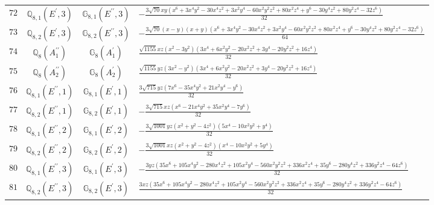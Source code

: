 \documentclass[fleqn,8pt,landscape]{jsarticle}
\begin{document}
\begin{table}[ht!]
\begin{center}
\begin{tabular}{cccl}
$ 72 $ & $ \mathbb{Q}_{8,1}(E^{\prime},3) $ & $ \mathbb{G}_{8,1}(E^{\prime\prime},3) $ & $ - \frac{3 \sqrt{70} x y \left(x^{6} + 3 x^{4} y^{2} - 30 x^{4} z^{2} + 3 x^{2} y^{4} - 60 x^{2} y^{2} z^{2} + 80 x^{2} z^{4} + y^{6} - 30 y^{4} z^{2} + 80 y^{2} z^{4} - 32 z^{6}\right)}{32} $ \\
$ 73 $ & $ \mathbb{Q}_{8,2}(E^{\prime},3) $ & $ \mathbb{G}_{8,2}(E^{\prime\prime},3) $ & $ - \frac{3 \sqrt{70} \left(x - y\right) \left(x + y\right) \left(x^{6} + 3 x^{4} y^{2} - 30 x^{4} z^{2} + 3 x^{2} y^{4} - 60 x^{2} y^{2} z^{2} + 80 x^{2} z^{4} + y^{6} - 30 y^{4} z^{2} + 80 y^{2} z^{4} - 32 z^{6}\right)}{64} $ \\
$ 74 $ & $ \mathbb{Q}_{8}(A_{1}^{\prime\prime}) $ & $ \mathbb{G}_{8}(A_{1}^{\prime}) $ & $ \frac{\sqrt{1155} x z \left(x^{2} - 3 y^{2}\right) \left(3 x^{4} + 6 x^{2} y^{2} - 20 x^{2} z^{2} + 3 y^{4} - 20 y^{2} z^{2} + 16 z^{4}\right)}{32} $ \\
$ 75 $ & $ \mathbb{Q}_{8}(A_{2}^{\prime\prime}) $ & $ \mathbb{G}_{8}(A_{2}^{\prime}) $ & $ \frac{\sqrt{1155} y z \left(3 x^{2} - y^{2}\right) \left(3 x^{4} + 6 x^{2} y^{2} - 20 x^{2} z^{2} + 3 y^{4} - 20 y^{2} z^{2} + 16 z^{4}\right)}{32} $ \\
$ 76 $ & $ \mathbb{Q}_{8,1}(E^{\prime\prime},1) $ & $ \mathbb{G}_{8,1}(E^{\prime},1) $ & $ \frac{3 \sqrt{715} y z \left(7 x^{6} - 35 x^{4} y^{2} + 21 x^{2} y^{4} - y^{6}\right)}{32} $ \\
$ 77 $ & $ \mathbb{Q}_{8,2}(E^{\prime\prime},1) $ & $ \mathbb{G}_{8,2}(E^{\prime},1) $ & $ - \frac{3 \sqrt{715} x z \left(x^{6} - 21 x^{4} y^{2} + 35 x^{2} y^{4} - 7 y^{6}\right)}{32} $ \\
$ 78 $ & $ \mathbb{Q}_{8,1}(E^{\prime\prime},2) $ & $ \mathbb{G}_{8,1}(E^{\prime},2) $ & $ - \frac{3 \sqrt{1001} y z \left(x^{2} + y^{2} - 4 z^{2}\right) \left(5 x^{4} - 10 x^{2} y^{2} + y^{4}\right)}{32} $ \\
$ 79 $ & $ \mathbb{Q}_{8,2}(E^{\prime\prime},2) $ & $ \mathbb{G}_{8,2}(E^{\prime},2) $ & $ - \frac{3 \sqrt{1001} x z \left(x^{2} + y^{2} - 4 z^{2}\right) \left(x^{4} - 10 x^{2} y^{2} + 5 y^{4}\right)}{32} $ \\
$ 80 $ & $ \mathbb{Q}_{8,1}(E^{\prime\prime},3) $ & $ \mathbb{G}_{8,1}(E^{\prime},3) $ & $ - \frac{3 y z \left(35 x^{6} + 105 x^{4} y^{2} - 280 x^{4} z^{2} + 105 x^{2} y^{4} - 560 x^{2} y^{2} z^{2} + 336 x^{2} z^{4} + 35 y^{6} - 280 y^{4} z^{2} + 336 y^{2} z^{4} - 64 z^{6}\right)}{32} $ \\
$ 81 $ & $ \mathbb{Q}_{8,2}(E^{\prime\prime},3) $ & $ \mathbb{G}_{8,2}(E^{\prime},3) $ & $ \frac{3 x z \left(35 x^{6} + 105 x^{4} y^{2} - 280 x^{4} z^{2} + 105 x^{2} y^{4} - 560 x^{2} y^{2} z^{2} + 336 x^{2} z^{4} + 35 y^{6} - 280 y^{4} z^{2} + 336 y^{2} z^{4} - 64 z^{6}\right)}{32} $ \\
 \hline \hline
\end{tabular}
\end{center}
\end{table}
\end{document}

